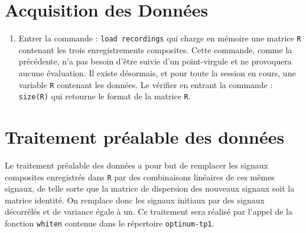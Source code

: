 \documentclass[10pt,a4paper,fleqn]{report}
\newcommand{\onit}{\begin{enumerate}}
\newcommand{\offit}{\end{enumerate}}
\renewcommand{\tt}{\texttt}
\begin{document}
\section{ Acquisition des Donn\'{e}es}

\onit
\item[ ] Entrer la commande : \tt{load recordings} qui charge en m\'{e}moire une matrice \tt R contenant les trois enregistrements composites. Cette commande, comme la pr\'{e}c\'{e}dente, n'a pas besoin d'\^{e}tre suivie d'un point-virgule et ne provoquera aucune \'{e}valuation. Il existe d\'{e}sormais, et pour toute la session en cours, une variable \tt R contenant les donn\'{e}es. Le v\'{e}rifier en entrant la commande : \tt{size(R)} qui retourne le format de la matrice \tt R.
\offit


\section{Traitement pr\'{e}alable des donn\'{e}es}

Le traitement pr\'{e}alable des donn\'{e}es a pour but de remplacer les signaux composites
enregistr\'{e}s dans \tt R par des combinaisons lin\'{e}aires de ces m\^{e}mes signaux, de telle sorte que la matrice de dispersion des nouveaux signaux soit la matrice identit\'{e}. On remplace donc les signaux initiaux par des signaux d\'{e}corr\'{e}l\'{e}s et de variance \'{e}gale \`{a} un. Ce traitement sera r\'{e}alis\'{e} par l'appel de la fonction \tt{whiten} contenue dans le r\'{e}pertoire \tt{optinum-tp1}.
\end{document}
